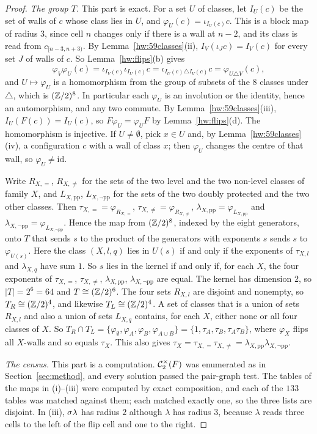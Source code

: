 \begin{proof}
\emph{The group $T$.} This part is exact. For a set $U$ of classes, let $I_U(c)$ be the set of walls of $c$ whose class lies in $U$, and $\varphi_U(c)=\iota_{I_U(c)}c$. This is a block map of radius $3$, since cell $n$ changes only if there is a wall at $n-2$, and its class is read from $c_{[n-3,n+3)}$. By Lemma~\ref{hw:59classes}(ii), $I_V(\iota_Jc)=I_V(c)$ for every set $J$ of walls of $c$. So Lemma~\ref{hw:flips}(b) gives
\[
\varphi_V\varphi_U(c)=\iota_{I_V(c)}\iota_{I_U(c)}c=\iota_{I_U(c)\triangle I_V(c)}c=\varphi_{U\triangle V}(c),
\]
and $U\mapsto\varphi_U$ is a homomorphism from the group of subsets of the $8$ classes under $\triangle$, which is $(\mathbb{Z}/2)^8$. In particular each $\varphi_U$ is an involution or the identity, hence an automorphism, and any two commute. By Lemma~\ref{hw:59classes}(iii), $I_U(F(c))=I_U(c)$, so $F\varphi_U=\varphi_UF$ by Lemma~\ref{hw:flips}(d). The homomorphism is injective. If $U\ne\emptyset$, pick $x\in U$ and, by Lemma~\ref{hw:59classes}(iv), a configuration $c$ with a wall of class $x$; then $\varphi_U$ changes the centre of that wall, so $\varphi_U\ne\mathrm{id}$.

Write $R_{X,=}$, $R_{X,\ne}$ for the sets of the two level and the two non-level classes of family $X$, and $L_{X,\mathrm{pp}}$, $L_{X,\lnot\mathrm{pp}}$ for the sets of the two doubly protected and the two other classes. Then $\tau_{X,=}=\varphi_{R_{X,=}}$, $\tau_{X,\ne}=\varphi_{R_{X,\ne}}$, $\lambda_{X,\mathrm{pp}}=\varphi_{L_{X,\mathrm{pp}}}$ and $\lambda_{X,\lnot\mathrm{pp}}=\varphi_{L_{X,\lnot\mathrm{pp}}}$. Hence the map from $(\mathbb{Z}/2)^8$, indexed by the eight generators, onto $T$ that sends $s$ to the product of the generators with exponents $s$ sends $s$ to $\varphi_{U(s)}$. Here the class $(X,l,q)$ lies in $U(s)$ if and only if the exponents of $\tau_{X,l}$ and $\lambda_{X,q}$ have sum $1$. So $s$ lies in the kernel if and only if, for each $X$, the four exponents of $\tau_{X,=}$, $\tau_{X,\ne}$, $\lambda_{X,\mathrm{pp}}$, $\lambda_{X,\lnot\mathrm{pp}}$ are equal. The kernel has dimension $2$, so $|T|=2^6=64$ and $T\cong(\mathbb{Z}/2)^6$. The four sets $R_{X,l}$ are disjoint and nonempty, so $T_R\cong(\mathbb{Z}/2)^4$, and likewise $T_L\cong(\mathbb{Z}/2)^4$. A set of classes that is a union of sets $R_{X,l}$ and also a union of sets $L_{X,q}$ contains, for each $X$, either none or all four classes of $X$. So $T_R\cap T_L=\{\varphi_\emptyset,\varphi_A,\varphi_B,\varphi_{A\cup B}\}=\{1,\tau_A,\tau_B,\tau_A\tau_B\}$, where $\varphi_X$ flips all $X$-walls and so equals $\tau_X$. This also gives $\tau_X=\tau_{X,=}\tau_{X,\ne}=\lambda_{X,\mathrm{pp}}\lambda_{X,\lnot\mathrm{pp}}$.

\emph{The census.} This part is a computation. $\mathcal{C}^{\times}_2(F)$ was enumerated as in Section~\ref{sec:method}, and every solution passed the pair-graph test. The tables of the maps in (i)--(iii) were computed by exact composition, and each of the $133$ tables was matched against them; each matched exactly one, so the three lists are disjoint. In (iii), $\sigma\lambda$ has radius $2$ although $\lambda$ has radius $3$, because $\lambda$ reads three cells to the left of the flip cell and one to the right.
\end{proof}

